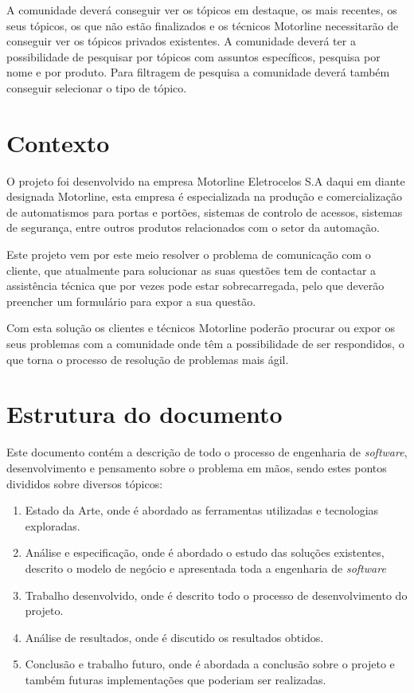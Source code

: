 A comunidade deverá conseguir ver os tópicos em destaque, os mais recentes, os seus tópicos, os que não estão finalizados e os técnicos Motorline necessitarão de conseguir ver os tópicos privados existentes. A comunidade deverá ter a possibilidade de pesquisar por tópicos com assuntos específicos, pesquisa por nome e por produto. Para filtragem de pesquisa a comunidade deverá também conseguir selecionar o tipo de tópico.

\section{Contexto}
O projeto foi desenvolvido na empresa Motorline Eletrocelos S.A daqui em diante designada Motorline, esta empresa é especializada na produção e comercialização de automatismos para portas e portões, sistemas de controlo de acessos, sistemas de segurança, entre outros produtos relacionados com o setor da automação.

Este projeto vem por este meio resolver o problema de comunicação com o cliente, que atualmente para solucionar as suas questões tem de contactar a assistência técnica que por vezes pode estar sobrecarregada, pelo que deverão preencher um formulário para expor a sua questão.

Com esta solução os clientes e técnicos Motorline poderão procurar ou expor os seus problemas com a comunidade onde têm a possibilidade de ser respondidos, o que torna o processo de resolução de problemas mais ágil.



\section{Estrutura do documento}

Este documento contém a descrição de todo o processo de engenharia de \textit{software}, desenvolvimento e pensamento sobre o problema em mãos, sendo estes pontos divididos sobre diversos tópicos:
\begin{enumerate}
  \item Estado da Arte, onde é abordado as ferramentas utilizadas e tecnologias exploradas.
  \item Análise e especificação, onde é abordado o estudo das soluções existentes, descrito o modelo de negócio e apresentada toda a engenharia de \textit{software}
  \item Trabalho desenvolvido, onde é descrito todo o processo de desenvolvimento do projeto.
  \item Análise de resultados, onde é discutido os resultados obtidos.
  \item Conclusão e trabalho futuro, onde é abordada a conclusão sobre o projeto e também futuras implementações que poderiam ser realizadas.
\end{enumerate}


